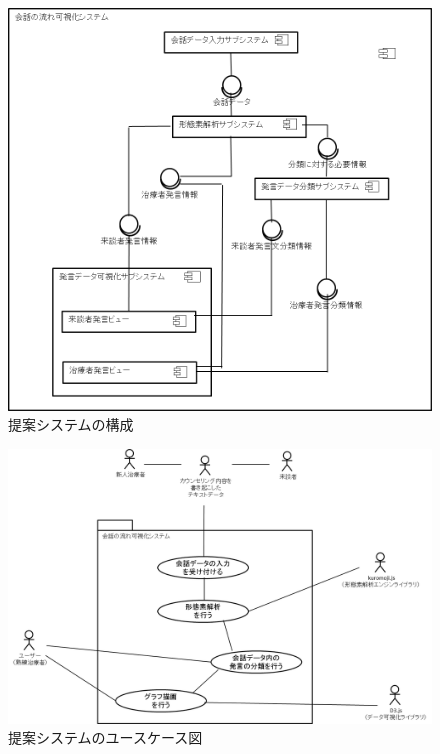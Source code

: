 \documentclass[shuuron]{kuee}
\begin{document}
\begin{figure}
  \begin{center}
    \includegraphics[width=\linewidth]{4_2.png}
  \end{center}
  \caption{提案システムの構成}
  \label{fig:4_2}
\end{figure}

\begin{figure}
  \begin{center}
    \includegraphics[width=\linewidth]{use_case_diagram.png}
  \end{center}
  \caption{提案システムのユースケース図}
  \label{fig:use_case_diagram}
\end{figure}
\end{document}
